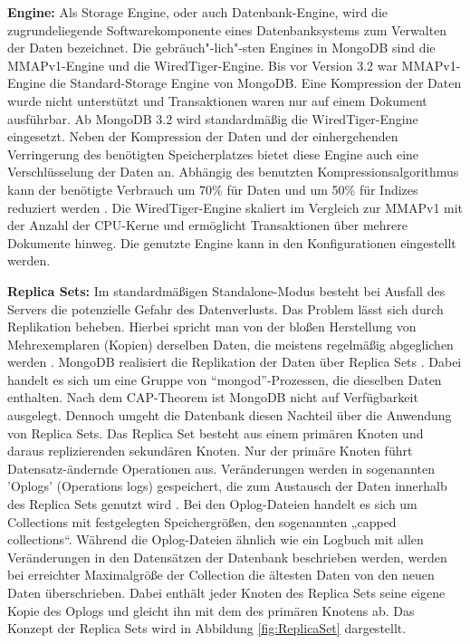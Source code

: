 \noindent
{}
\textbf{Engine:}
Als Storage Engine, oder auch Datenbank-Engine, wird die zugrundeliegende Softwarekomponente eines Datenbanksystems zum Verwalten der Daten bezeichnet. Die gebräuch"-lich"-sten Engines in MongoDB sind die MMAPv1-Engine und die WiredTiger-Engine.\newline
Bis vor Version 3.2 war MMAPv1-Engine die Standard-Storage Engine von MongoDB. Eine Kompression der Daten wurde nicht unterstützt und Transaktionen waren nur auf einem Dokument ausführbar. Ab MongoDB 3.2 wird standardmäßig die WiredTiger-Engine eingesetzt. Neben der Kompression der Daten und der einhergehenden Verringerung des benötigten Speicherplatzes bietet diese Engine auch eine Verschlüsselung der Daten an. Abhängig des benutzten Kompressionsalgorithmus kann der benötigte Verbrauch um 70\% für Daten und um 50\% für Indizes reduziert werden \cite{DB3.5}. Die WiredTiger-Engine skaliert im Vergleich zur MMAPv1 mit der Anzahl der CPU-Kerne und ermöglicht Transaktionen über mehrere Dokumente hinweg. Die genutzte Engine kann in den Konfigurationen eingestellt werden.
\newline

\noindent
{}
\textbf{Replica Sets:}
Im standardmäßigen Standalone-Modus besteht bei Ausfall des Servers die potenzielle Gefahr des Datenverlusts. Das Problem lässt sich durch Replikation beheben. Hierbei spricht man von der bloßen Herstellung von Mehrexemplaren (Kopien) derselben Daten, die meistens regelmäßig abgeglichen werden \cite{DB3.6}. MongoDB realisiert die Replikation der Daten über Replica Sets \cite{DB3.7}. Dabei handelt es sich um eine Gruppe von \enquote{mongod}-Prozessen, die dieselben Daten enthalten. Nach dem CAP-Theorem ist MongoDB nicht auf Verfügbarkeit ausgelegt. Dennoch umgeht die Datenbank diesen Nachteil über die Anwendung von Replica Sets. Das Replica Set besteht aus einem primären Knoten und daraus replizierenden sekundären Knoten.
Nur der primäre Knoten führt Datensatz-ändernde Operationen aus. Veränderungen werden in sogenannten 'Oplogs' (Operations logs) gespeichert, die zum Austausch der Daten innerhalb des Replica Sets genutzt wird \cite{DB3.8}. Bei den Oplog-Dateien handelt es sich um Collections mit festgelegten Speichergrößen, den sogenannten „capped collections“. Während die Oplog-Dateien ähnlich wie ein Logbuch mit allen Veränderungen in den Datensätzen der Datenbank beschrieben werden, werden bei erreichter Maximalgröße der Collection die ältesten Daten von den neuen Daten überschrieben. Dabei enthält jeder Knoten des Replica Sets seine eigene Kopie des Oplogs und gleicht ihn mit dem des primären Knotens ab. Das Konzept der Replica Sets wird in Abbildung \ref{fig:ReplicaSet} dargestellt.\\

